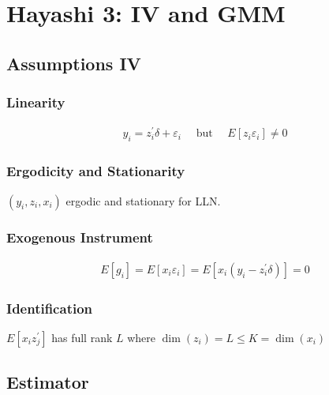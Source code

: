 \section{Hayashi 3: IV and GMM}

\subsection{Assumptions IV}

\subsubsection{Linearity}

\begin{align*}
    y_i=z_i^{\prime} \delta+\varepsilon_i \quad \text { but } \quad E\left[z_i \varepsilon_i\right] \neq 0
\end{align*}

\subsubsection{Ergodicity and Stationarity}

$\left(y_i, z_i, x_i\right)$ ergodic and stationary for LLN.

\subsubsection{Exogenous Instrument}

\begin{align*}
    E\left[g_i\right]=E\left[x_i \varepsilon_i\right]=E\left[x_i\left(y_i-z_i^{\prime} \delta\right)\right]=0
\end{align*}

\subsubsection{Identification}

$E\left[x_i z_j^{\prime}\right]$ has full rank $L$ where $\operatorname{dim}(z_i) = L \leq K = \operatorname{dim}(x_i)$

\subsection{Estimator}

